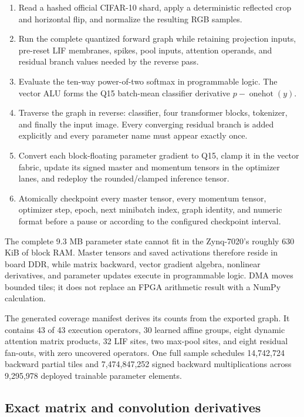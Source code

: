 \documentclass[10pt]{article}
\begin{document}
\begin{enumerate}
  \item Read a hashed official CIFAR-10 shard, apply a deterministic reflected
  crop and horizontal flip, and normalize the resulting RGB samples.
  \item Run the complete quantized forward graph while retaining projection
  inputs, pre-reset LIF membranes, spikes, pool inputs, attention operands, and
  residual branch values needed by the reverse pass.
  \item Evaluate the ten-way power-of-two softmax in programmable logic. The
  vector ALU forms the Q15 batch-mean classifier derivative
  $p-\operatorname{onehot}(y)$.
  \item Traverse the graph in reverse: classifier, four transformer blocks,
  tokenizer, and finally the input image. Every converging residual branch is
  added explicitly and every parameter name must appear exactly once.
  \item Convert each block-floating parameter gradient to Q15, clamp it in the
  vector fabric, update its signed master and momentum tensors in the optimizer
  lanes, and redeploy the rounded/clamped inference tensor.
  \item Atomically checkpoint every master tensor, every momentum tensor,
  optimizer step, epoch, next minibatch index, graph identity, and numeric
  format before a pause or according to the configured checkpoint interval.
\end{enumerate}

The complete 9.3 MB parameter state cannot fit in the Zynq-7020's roughly
630 KiB of block RAM. Master tensors and saved activations therefore reside in
board DDR, while matrix backward, vector gradient algebra, nonlinear
derivatives, and parameter updates execute in programmable logic. DMA moves
bounded tiles; it does not replace an FPGA arithmetic result with a NumPy
calculation.

The generated coverage manifest derives its counts from the exported graph. It
contains 43 of 43 execution operators, 30 learned affine groups, eight dynamic
attention matrix products, 32 LIF sites, two max-pool sites, and eight residual
fan-outs, with zero uncovered operators. One full sample schedules 14,742,724
backward partial tiles and 7,474,847,252 signed backward multiplications across
9,295,978 deployed trainable parameter elements.

\subsection{Exact matrix and convolution derivatives}
\end{document}
